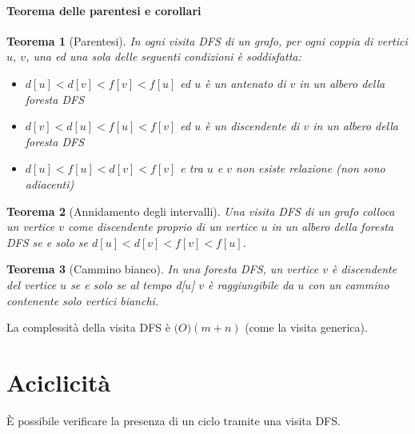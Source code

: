 \documentclass[11pt]{book}
\newtheorem*{theorem}{Teorema}
\begin{document}
\subsubsection{Teorema delle parentesi e corollari}
\begin{theorem}[Parentesi]
    In ogni visita DFS di un grafo, per ogni coppia di vertici $u$, $v$, una ed una sola delle seguenti condizioni è soddisfatta: 
    \begin{itemize}
        \item $d[u]<d[v]<f[v]<f[u]$ ed $u$ è un \textit{antenato} di $v$ in un albero della foresta DFS 
        \item $d[v]<d[u]<f[u]<f[v]$ ed $u$ è un \textit{discendente} di $v$ in un albero della foresta DFS
        \item $d[u]<f[u]<d[v]<f[v]$ e tra $u$ e $v$ non esiste relazione (non sono adiacenti)
    \end{itemize}
\end{theorem}
\begin{theorem}[Annidamento degli intervalli]
    Una visita DFS di un grafo colloca un vertice $v$ come discendente proprio di un vertice $u$ in un albero della foresta 
    DFS se e solo se $d[u]<d[v]<f[v]<f[u]$.
\end{theorem}
\begin{theorem}[Cammino bianco]
    In una foresta DFS, un vertice $v$ è discendente del vertice $u$ se e solo se al tempo d[$u$] $v$ è raggiungibile da 
    $u$ con un cammino contenente solo vertici bianchi.
\end{theorem}
La complessità della visita DFS è $\mathcal(O)(m+n)$ (come la visita generica).
\chapter{Aciclicità}
È possibile verificare la presenza di un ciclo tramite una visita DFS.
\end{document}
